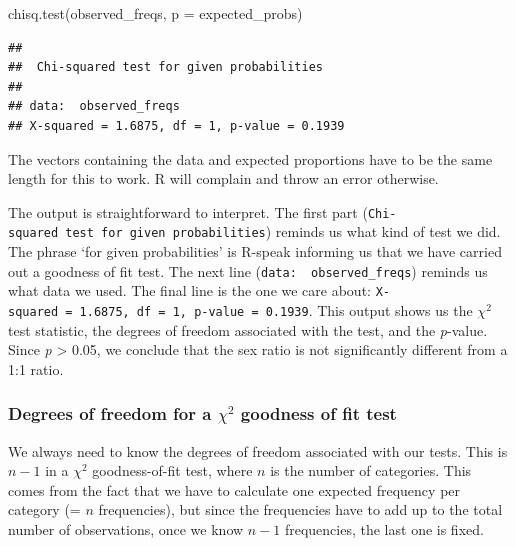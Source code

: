 \documentclass[
]{book}
\newenvironment{Shaded}{\begin{snugshade}}{\end{snugshade}}
\newcommand{\AttributeTok}[1]{\textcolor[rgb]{0.77,0.63,0.00}{#1}}
\newcommand{\FunctionTok}[1]{\textcolor[rgb]{0.00,0.00,0.00}{#1}}
\newcommand{\NormalTok}[1]{#1}
\newenvironment{greybox}{
  \definecolor{shadecolor}{rgb}{0.95,0.95,0.95}  %
  \color{black}
  \begin{shaded}}
 {\end{shaded}}
\newenvironment{infobox}[1]
  {
  \begin{itemize}
  \renewcommand{\labelitemi}{
    \raisebox{-.7\height}[0pt][0pt]{
      {\setkeys{Gin}{width=3em,keepaspectratio}
        \texttt{[image: images/\#1]}}
    }
  }
  \setlength{\fboxsep}{1em}
  \begin{greybox}
  \item
  }
  {
  \end{greybox}
  \end{itemize}
  }
\begin{document}
\begin{Shaded}
\begin{Highlighting}[]
\FunctionTok{chisq.test}\NormalTok{(observed\_freqs, }\AttributeTok{p =}\NormalTok{ expected\_probs)}
\end{Highlighting}
\end{Shaded}

\begin{verbatim}
## 
##  Chi-squared test for given probabilities
## 
## data:  observed_freqs
## X-squared = 1.6875, df = 1, p-value = 0.1939
\end{verbatim}

The vectors containing the data and expected proportions have to be the same length for this to work. R will complain and throw an error otherwise.

The output is straightforward to interpret. The first part (\texttt{Chi-squared\ test\ for\ given\ probabilities}) reminds us what kind of test we did. The phrase `for given probabilities' is R-speak informing us that we have carried out a goodness of fit test. The next line (\texttt{data:\ \ observed\_freqs}) reminds us what data we used. The final line is the one we care about: \texttt{X-squared\ =\ 1.6875,\ df\ =\ 1,\ p-value\ =\ 0.1939}. This output shows us the \(\chi^{2}\) test statistic, the degrees of freedom associated with the test, and the \emph{p}-value. Since \emph{p} \textgreater{} 0.05, we conclude that the sex ratio is not significantly different from a 1:1 ratio.

\begin{infobox}{information}

\hypertarget{degrees-of-freedom-for-a-chi2-goodness-of-fit-test}{%
\subsubsection*{\texorpdfstring{Degrees of freedom for a \(\chi^{2}\) goodness of fit test}{Degrees of freedom for a \textbackslash chi\^{}\{2\} goodness of fit test}}\label{degrees-of-freedom-for-a-chi2-goodness-of-fit-test}}

We always need to know the degrees of freedom associated with our tests. This is \(n-1\) in a \(\chi^{2}\) goodness-of-fit test, where \(n\) is the number of categories. This comes from the fact that we have to calculate one expected frequency per category (= \(n\) frequencies), but since the frequencies have to add up to the total number of observations, once we know \(n-1\) frequencies, the last one is fixed.

\end{infobox}
\end{document}
